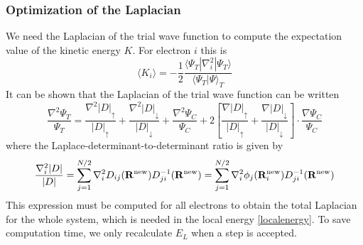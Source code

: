\documentclass[english, a4paper]{article}
\begin{document}
\subsubsection{Optimization of the Laplacian}
We need the Laplacian of the trial wave function to compute the expectation value of the kinetic
energy $K$. For electron $i$ this is
\begin{equation}
 \langle K_i \rangle = -\frac{1}{2} \frac{\langle\Psi_T|\nabla_i^2|\Psi_T\rangle}{\langle\Psi_T|\Psi\rangle_T}
 \label{kineticEnergy}
\end{equation}
It can be shown that the Laplacian of the trial wave function can be written
\begin{equation}
 \frac{\nabla^2\Psi_T}{\Psi_T} = \frac{\nabla^2|D|_\uparrow}{|D|_\uparrow} + 
 \frac{\nabla^2|D|_\downarrow}{|D|_\downarrow} + \frac{\nabla^2\Psi_C}{\Psi_C} + 
 2\left[\frac{\nabla|D|_\uparrow}{|D|_\uparrow} + \frac{\nabla|D|_\downarrow}{|D|_\downarrow}\right]
 \cdot \frac{\nabla \Psi_C}{\Psi_C}
\end{equation}
where the Laplace-determinant-to-determinant ratio is given by
\begin{equation}
 \frac{\nabla_i^2|D|}{|D|} = \sum_{j=1}^{N/2}\nabla_i^2D_{ij}({\bf R}^{\textrm{new}})D_{ji}^{-1}({\bf R}^{\textrm{new}})
 = \sum_{j=1}^{N/2}\nabla_i^2\phi_j({\bf R}_i^{\textrm{new}})D_{ji}^{-1}({\bf R}^{\textrm{new}})
\end{equation}
This expression must be computed for all electrons to obtain the total Laplacian for the whole system, which is needed
in the local energy \eqref{localenergy}. To save computation time, we only recalculate $E_L$ when
a step is accepted. 
\end{document}
